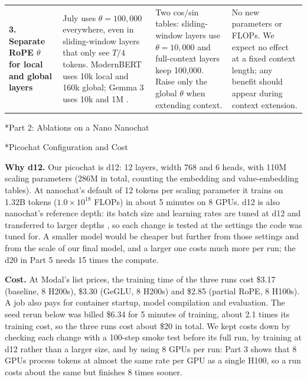 \documentclass[11pt]{article}
\makeatletter
\renewcommand\section{\@startsection{section}{1}{\z@}{1.2em}{0.5em}{\large\bfseries}}
\renewcommand\subsection{\@startsection{subsection}{2}{\z@}{0.6em}{0.2em}{\normalsize\bfseries}}
\makeatother
\begin{document}
{\begin{longtable}{L{2.4cm} L{4.2cm} L{4.2cm} L{3.4cm}}
\textbf{3. Separate RoPE $\theta$ for local and global layers} \newline \cite{gemma3} &
July uses $\theta = 100{,}000$ everywhere, even in sliding-window layers that only see $T/4$ tokens. ModernBERT uses 10k local and 160k global; Gemma 3 uses 10k and 1M \cite{gemma3}. &
Two cos/sin tables: sliding-window layers use $\theta = 10{,}000$ and full-context layers keep 100,000. Raise only the global $\theta$ when extending context. &
No new parameters or FLOPs. We expect no effect at a fixed context length; any benefit should appear during context extension. \\

\end{longtable}
}

\newpage

\section*{Part 2: Ablations on a Nano Nanochat}

\subsection*{Picochat Configuration and Cost}

\textbf{Why d12.} Our picochat is d12: 12 layers, width 768 and 6 heads, with 110M scaling parameters (286M in total, counting the embedding and value-embedding tables). At nanochat's default of 12 tokens per scaling parameter it trains on 1.32B tokens ($1.0 \times 10^{18}$ FLOPs) in about 5 minutes on 8 GPUs. d12 is also nanochat's reference depth: its batch size and learning rates are tuned at d12 and transferred to larger depths \cite{nanochat}, so each change is tested at the settings the code was tuned for. A smaller model would be cheaper but further from those settings and from the scale of our final model, and a larger one costs much more per run; the d20 in Part 5 needs 15 times the compute.

\textbf{Cost.} At Modal's list prices, the training time of the three runs cost \$3.17 (baseline, 8 H200s), \$3.30 (GeGLU, 8 H200s) and \$2.85 (partial RoPE, 8 H100s). A job also pays for container startup, model compilation and evaluation. The seed rerun below was billed \$6.34 for 5 minutes of training, about 2.1 times its training cost, so the three runs cost about \$20 in total. We kept costs down by checking each change with a 100-step smoke test before its full run, by training at d12 rather than a larger size, and by using 8 GPUs per run: Part 3 shows that 8 GPUs process tokens at almost the same rate per GPU as a single H100, so a run costs about the same but finishes 8 times sooner.
\end{document}
